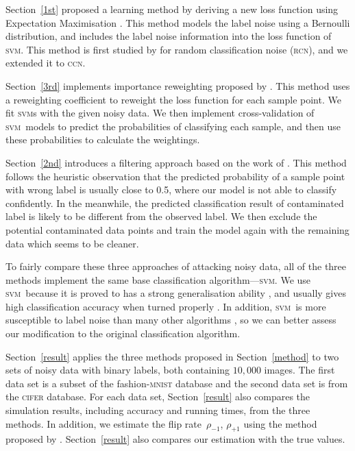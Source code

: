 \documentclass[12pt]{article} %
\newcommand{\svm}{\textsc{svm}}
\newcommand{\rhoo}{\rho_{+1}}
\newcommand{\rhoz}{\rho_{-1}}
\begin{document}
Section~\ref{1st} proposed a learning method by deriving a new loss function using Expectation Maximisation \citep[p.423]{Bishop:2006:PRM:1162264}. This method models the label noise using a Bernoulli distribution, and includes the label noise information into the loss function of \svm. This method is first studied by \citet{pmlr-v20-biggio11} for random classification noise (\textsc{rcn}), and we extended it to \textsc{ccn}.

Section~\ref{3rd} implements importance reweighting proposed by \citet{liu2016classification}. This method uses a reweighting coefficient to reweight the loss function for each sample point. We fit \svm s with the given noisy data. We then implement cross-validation of \svm\ models to predict the probabilities of classifying each sample, and then use these probabilities to calculate the weightings.

Section~\ref{2nd} introduces a filtering approach based on the work of \citet{brodley1996identifying}. This method follows the heuristic observation that the predicted probability of a sample point with wrong label is usually close to 0.5, where our model is not able to classify confidently. In the meanwhile, the predicted classification result of contaminated label is likely to be different from the observed label.  We then exclude the potential contaminated data points and train the model again with the remaining data which seems to be cleaner.

To fairly compare these three approaches of attacking noisy data, all of the three methods implement the same base classification algorithm---\svm. We use \svm\ because it is proved to has a strong generalisation ability \citep{NIPS2012_4500,Seeger:2003:PGE:944919.944929,Cortes1995}, and usually gives high classification accuracy when turned properly \citep{Fernandez-Delgado:2014:WNH:2627435.2697065}. In addition, \svm\ is more susceptible to label noise than many other algorithms \citep{frenay2014classification}, so we can better assess our modification to the original classification algorithm.

Section~\ref{result} applies the three methods proposed in Section~\ref{method} to two sets of noisy data with binary labels, both containing $10,000$ images. The first data set is a subset of the fashion-\textsc{mnist} database and the second data set is from the \textsc{cifer} database. For each data set, Section~\ref{result} also compares the simulation results, including accuracy and running times, from the three methods. In addition, we estimate the flip rate~$\rhoz$, $\rhoo$ using the method proposed by \citet{liu2016classification}.
Section~\ref{result} also compares our estimation with the true values.
\end{document}
